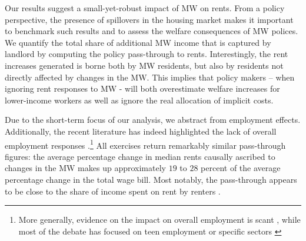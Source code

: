 Our results suggest a small-yet-robust impact of MW on rents. From a policy perspective, 
the presence of spillovers in the housing market makes it important to benchmark such results 
and to assess the welfare consequences of MW polices. 
We quantify the total share of additional MW income that is captured by landlord 
by computing the policy pass-through to rents. Interestingly, the rent increases generated is 
borne both by MW residents, but also by residents not directly affected by changes in the MW. 
This implies that policy makers -- when ignoring rent responses to MW - will both overestimate 
welfare increases for lower-income workers as well as ignore the real allocation of implicit costs. 

Due to the short-term focus of our analysis, we abstract from employment effects. Additionally, 
the recent literature has indeed highlighted the lack of overall employment responses 
\parencite{CegnizEtAl2019}.\footnote{More generally, evidence on the impact on overall 
	employment is scant \parencite{dube2019impacts}, while most of the debate has focused on 
	teen employment \parencite{card1992using, allegretto2017credible} or specific sectors 
	\parencite{katz1992effect, card2000minimum, dube2010minimum}} All exercises return 
remarkably similar pass-through figures: the average percentage change in median rents causally 
ascribed to changes in the MW makes up approximately $19$ to $28$ percent of the average 
percentage change in the total wage bill. Most notably, the pass-through appears to be close 
to the share of income spent on rent by renters \parencite{fernald2020americas}.
